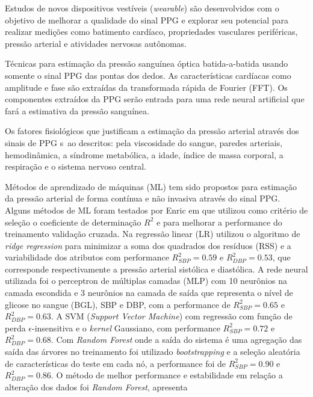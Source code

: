 \documentclass[conference,compsoc]{IEEEtran}
\begin{document}
Estudos de novos dispositivos vest\'iveis (\textit{wearable}) s\~ao desenvolvidos com o objetivo de melhorar a qualidade do sinal PPG e explorar seu potencial para realizar medi\c{c}\~oes como batimento card\'iaco, propriedades vasculares perif\'ericas, press\~ao arterial e atividades nervosas aut\^onomas.\cite{GEUN:2008} 

T\'ecnicas para estima\c{c}\~ao da press\~ao sangu\'inea \'optica batida-a-batida usando somente o sinal PPG das pontas dos dedos. As caracter\'isticas card\'iacas como amplitude e fase s\~ao extra\'idas da transformada r\'apida de Fourier (FFT). Os componentes extra\'idos da PPG ser\~ao entrada para uma rede neural artificial que far\'a a estimativa da press\~ao sangu\'inea.\cite{XING:2016}

Os fatores fisiol\'ogicos que justificam a estima\c{c}\~ao da press\~ao arterial atrav\'es dos sinais de PPG s~ao descritos: pela viscosidade do sangue, paredes arteriais, hemodin\^amica, a s\'indrome metab\'olica, a idade, \'indice de massa corporal, a respira\c{c}\~ao e o sistema nervoso central. \cite{MORENO:2011}


M\'etodos de aprendizado de m\'aquinas (ML) tem sido propostos para estima\c{c}\~ao da press\~ao arterial de forma cont\'inua e n\~ao invasiva atrav\'es do sinal PPG. 
Alguns m\'etodos de ML foram testados por Enric em \cite{MORENO:2011} que utilizou como crit\'erio de sele\c{c}\~ao o coeficiente de determina\c{c}\~ao $R^2$ e para melhorar a performance do treinamento valida\c{c}\~ao cruzada. 
Na regress\~ao linear (LR) utilizou o algoritmo de \textit{ridge regression} para minimizar a soma dos quadrados dos res\'iduos (RSS) e a variabilidade dos atributos com performance $R^2_{SBP} = 0.59$ e $R^2_{DBP} = 0.53$, que corresponde respectivamente a press\~ao arterial sist\'olica e diast\'olica.
A rede neural utilizada foi o perceptron de m\'ultiplas camadas (MLP) com 10 neur\^onios na camada escondida e 3 neur\^onios na camada de sa\'ida que representa o n\'ivel de glicose no sangue (BGL), SBP e DBP, com a performance de $R^2_{SBP} = 0.65$ e $R^2_{DBP} = 0.63$.  A SVM (\textit{Support Vector Machine}) com regress\~ao com fun\c{c}\~ao de perda $\epsilon$-insensitiva e 
o \textit{kernel} Gaussiano, com performance $R^2_{SBP} = 0.72$ e $R^2_{DBP} = 0.68$. Com \textit{Random Forest} onde a sa\'ida do sistema \'e uma agrega\c{c}\~ao das sa\'ida das \'arvores no treinamento foi utilizado \textit{bootstrapping} e a sele\c{c}\~ao aleat\'oria de caracter\'isticas do teste em cada n\'o, a performance foi de $R^2_{SBP} = 0.90$ e $R^2_{DBP} = 0.86$. O m\'etodo de melhor performance e estabilidade em rela\c{c}\~ao a altera\c{c}\~ao dos dados foi \textit{Random Forest}, apresenta 
\end{document}
